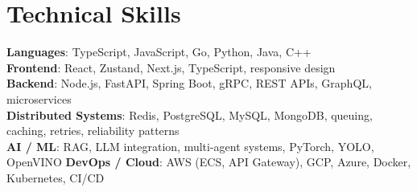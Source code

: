 \documentclass[letterpaper,11pt]{article}
\begin{document}
\section{Technical Skills}
 \begin{itemize}[leftmargin=0.15in, label={}]
    \small{\item{
\textbf{Languages}{: TypeScript, JavaScript, Go, Python, Java, C++} \\
\textbf{Frontend}{: React, Zustand, Next.js, TypeScript, responsive design} \\
\textbf{Backend}{: Node.js, FastAPI, Spring Boot, gRPC, REST APIs, GraphQL, microservices} \\
\textbf{Distributed Systems}{: Redis, PostgreSQL, MySQL, MongoDB, queuing, caching, retries, reliability patterns} \\
\textbf{AI / ML}{: RAG, LLM integration, multi-agent systems, PyTorch, YOLO, OpenVINO} \hspace{5pt} \textbf{DevOps / Cloud}{: AWS (ECS, API Gateway), GCP, Azure, Docker, Kubernetes, CI/CD}
    }}
 \end{itemize}


\end{document}
